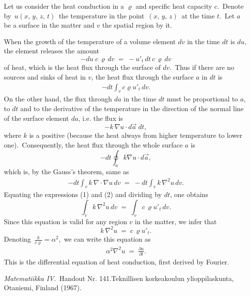 \documentclass[12pt]{article}
\theoremstyle{definition}
\begin{document}
Let us consider the heat conduction in a  $\varrho$ and specific heat capacity $c$.\, Denote by \,$u(x,\,y,\,z,\,t)$\, the temperature in the point \,$(x,\,y,\,z)$\, at the time $t$.\, Let $a$ be a   surface in the matter and $v$ the spatial region  by it.

When the growth of the temperature of a volume element $dv$ in the time $dt$ is $du$, the element releases the amount 
$$-du\;c\,\varrho\,dv \;=\; -u'_t\,dt\,c\,\varrho\,dv$$
of heat, which is the heat flux through the surface of $dv$.\, Thus if there are no sources and sinks of heat in $v$, the heat flux through the surface $a$ in $dt$ is
\begin{align}
-dt\int_vc\varrho u'_t\,dv.
\end{align}
On the other hand, the flux through $da$ in the time $dt$ must be proportional to $a$, to $dt$ and to the derivative of the temperature in the direction of the normal line of the surface element $da$, i.e. the flux is
$$-k\,\nabla{u}\cdot d\vec{a}\;dt,$$
where $k$ is a positive  (because the heat  always from higher temperature to lower one).\, Consequently, the heat flux through the whole surface $a$ is
$$-dt\oint_ak\nabla{u}\cdot d\vec{a},$$
which is, by the Gauss's theorem, same as
\begin{align}
-dt\int_vk\,\nabla\cdot\nabla{u}\,dv \;=\; -dt\int_vk\,\nabla^2u\,dv.
\end{align}
Equating the expressions (1) and (2) and dividing by $dt$, one obtains
$$\int_vk\,\nabla^2u\,dv \;=\; \int_vc\,\varrho u'_t\,dv.$$
Since this equation is valid for any region $v$ in the matter, we infer that 
$$k\,\nabla^2u \;=\; c\,\varrho u'_t.$$
Denoting\, $\displaystyle\frac{k}{c\varrho} = \alpha^2$,\, we can write this equation as
\begin{align}
\alpha^2\nabla^2u \;=\; \frac{\partial u}{\partial t}.
\end{align}
This is the differential equation of heat conduction, first derived by Fourier.

\begin{thebibliography}{9}
 {\em Matematiikka IV}.\, Handout Nr. 141.\quad Teknillisen korkeakoulun ylioppilaskunta, Otaniemi, Finland (1967).
\end{thebibliography}
\end{document}
